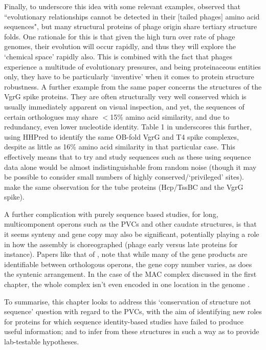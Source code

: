 Finally, to underscore this idea with some relevant examples, \cite{Leiman2010} observed that ``evolutionary relationships cannot be detected in their [tailed phages] amino acid sequences", but many structural proteins of phage origin share tertiary structure folds. One rationale for this is that given the high turn over rate of phage genomes, their evolution will occur rapidly, and thus they will explore the `chemical space' rapidly also. This is combined with the fact that phages experience a multitude of evolutionary pressures, and being proteinaceous entities only, they have to be particularly `inventive' when it comes to protein structure robustness. A further example from the same paper concerns the structures of the VgrG spike proteins. They are often structurally very well conserved which is usually immediately apparent on visual inspection, and yet, the sequences of certain orthologues may share $<$15\% amino acid similarity, and due to redundancy, even lower nucleotide identity. Table 1 in \cite{Browning2012} underscores this further, using HHPred to identify the same OB-fold VgrG and T4 spike complexes, despite as little as 16\% amino acid similarity in that particular case. This effectively means that to try and study sequences such as these using sequence data alone would be almost indistinguishable from random noise (though it may be possible to consider small numbers of highly conserved/`privileged' sites). \cite{Silverman2012} make the same observation for the tube proteins (Hcp/TssBC and the VgrG spike).

A further complication with purely sequence based studies, for long, multicomponent operons such as the PVCs and other caudate structures, is that it seems synteny and gene copy may also be significant, potentially playing a role in how the assembly is choreographed (phage early versus late proteins for instance). Papers like that of \cite{Sarris2014}, note that while many of the gene products are identifiable between orthologous operons, the gene copy number varies, as does the syntenic arrangement. In the case of the MAC complex discussed in the first chapter, the whole complex isn't even encoded in one location in the genome \citep{Shikuma2014}. 


To summarise, this chapter looks to address this `conservation of structure not sequence' question with regard to the PVCs, with the aim of identifying new roles for proteins for which sequence identity-based studies have failed to produce useful information; and to infer from these structures in such a way as to provide lab-testable hypotheses.

